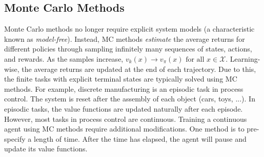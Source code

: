 \subsection{Monte Carlo Methods}
Monte Carlo methods no longer require explicit system models (a characteristic known as \textit{model-free}).  Instead, MC methods \textit{estimate} the average returns for different policies through sampling infinitely many sequences of states, actions, and rewards. As the samples increase, $v_k(x) \rightarrow v_{\pi}(x) \text{ for all } x \in \mathcal{X}$. Learning-wise, the average returns are updated at the end of each trajectory. Due to this, the finite tasks with explicit terminal states are typically solved using MC methods. For example, discrete manufacturing is an episodic task in process control. The system is reset after the assembly of each object (cars, toys, ...).  In episodic tasks, the value functions are updated naturally after each episode. However, most tasks in process control are continuous. Training a continuous agent using MC methods require additional modifications. One method is to pre-specify a length of time. After the time has elapsed, the agent will pause and update its value functions. 

